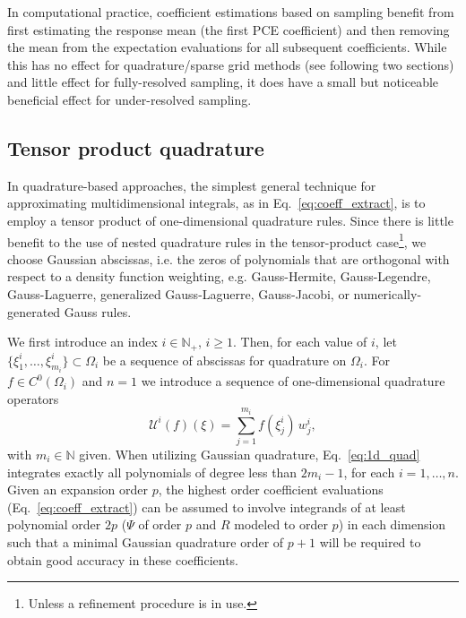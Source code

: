 In computational practice, coefficient estimations based on sampling
benefit from first estimating the response mean (the first PCE
coefficient) and then removing the mean from the expectation
evaluations for all subsequent coefficients.  While this has no effect
for quadrature/sparse grid methods (see following two sections) and
little effect for fully-resolved sampling, it does have a small but
noticeable beneficial effect for under-resolved sampling.


\subsection{Tensor product quadrature} \label{uq:expansion:spectral_quad}

In quadrature-based approaches, the simplest general technique for
approximating multidimensional integrals, as in
Eq.~\ref{eq:coeff_extract}, is to employ a tensor product of
one-dimensional quadrature rules.  %
Since there is little benefit to the use of nested quadrature rules in
the tensor-product case\footnote{Unless a refinement procedure is in
  use.}, we choose Gaussian abscissas, i.e. the zeros of polynomials
that are orthogonal with respect to a density function weighting,
e.g. Gauss-Hermite, Gauss-Legendre, Gauss-Laguerre, generalized
Gauss-Laguerre, Gauss-Jacobi, or numerically-generated Gauss rules.

We first introduce an index $i\in\mathbb{N}_+$, $i\ge1$. Then, for
each value of $i$, let $\{\xi_1^i, \ldots,\xi_{m_i}^i\}\subset \Omega_i$ 
be a sequence of abscissas for quadrature on $\Omega_i$.  For 
$f\in C^0(\Omega_i)$ and $n=1$ we introduce a sequence of
one-dimensional quadrature operators
\begin{equation}\label{eq:1d_quad}
\mathscr{U}^i(f)(\xi)=\sum_{j=1}^{m_i}f(\xi_j^i)\, w^i_j, 
\end{equation}
with $m_i\in\mathbb{N}$ given.  When utilizing Gaussian quadrature,
Eq.~\ref{eq:1d_quad} integrates exactly all polynomials of degree less
than $2m_i -1$, for each $i=1,\ldots, n$.  Given an expansion order
$p$, the highest order coefficient evaluations
(Eq.~\ref{eq:coeff_extract}) can be assumed to involve integrands of
at least polynomial order $2p$ ($\Psi$ of order $p$ and $R$ modeled to
order $p$) in each dimension such that a minimal Gaussian quadrature
order of $p+1$ will be required to obtain good accuracy in these
coefficients.

